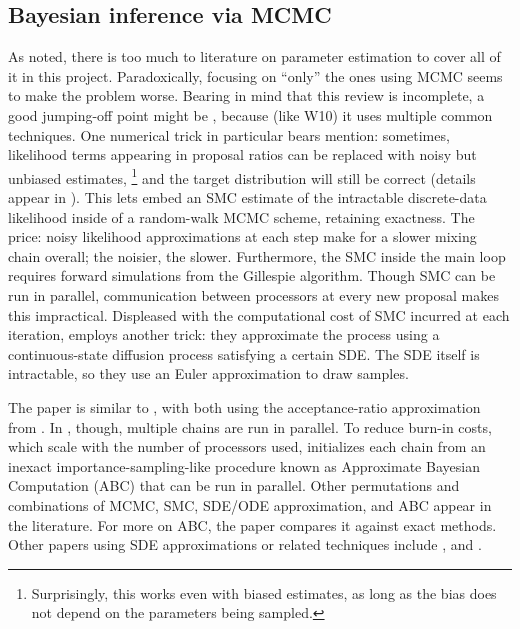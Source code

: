 \documentclass{article}
\begin{document}
\subsection{Bayesian inference via MCMC}
As noted, there is too much to literature on parameter estimation to cover all of it in this project. Paradoxically, focusing on ``only'' the ones using MCMC seems to make the problem worse. Bearing in mind that this review is incomplete, a good jumping-off point might be \cite{golightly2011bayesian}, because (like W10) it uses multiple common techniques. One numerical trick in particular bears mention: sometimes, likelihood terms appearing in proposal ratios can be replaced with noisy but unbiased estimates,
%
\footnote{Surprisingly, this works even with biased estimates, as long as the bias does not depend on the parameters being sampled.}
%
 and the target distribution will still be correct (details appear in \cite{andrieu2010particle}). This lets \cite{golightly2011bayesian} embed an SMC estimate of the intractable discrete-data likelihood inside of a random-walk MCMC scheme, retaining exactness. The price: noisy likelihood approximations at each step make for a slower mixing chain overall; the noisier, the slower. Furthermore, the SMC inside the main loop requires forward simulations from the Gillespie algorithm. Though SMC can be run in parallel, communication between processors at every new proposal makes this impractical. Displeased with the computational cost of SMC incurred at each iteration, \cite{golightly2011bayesian} employs another trick: they approximate the process using a continuous-state diffusion process satisfying a certain SDE. The SDE itself is intractable, so they use an Euler approximation to draw samples. 

The paper \cite{owen2014scalable} is similar to \cite{golightly2011bayesian}, with both using the acceptance-ratio approximation from \cite{andrieu2010particle}. In \cite{owen2014scalable}, though, multiple chains are run in parallel. To reduce burn-in costs, which scale with the number of processors used, \cite{owen2014scalable} initializes each chain from an inexact importance-sampling-like procedure known as Approximate Bayesian Computation (ABC) that can be run in parallel. Other permutations and combinations of MCMC, SMC, SDE/ODE approximation, and ABC appear in the literature. For more on ABC, the paper \cite{owen2014ABC_LF-MCMCcomparison} compares it against exact methods. Other papers using SDE approximations or related techniques include \cite{golightly2005bayesian}, \cite{Boys2008} and \cite{fearnhead2014inference}.
\end{document}
